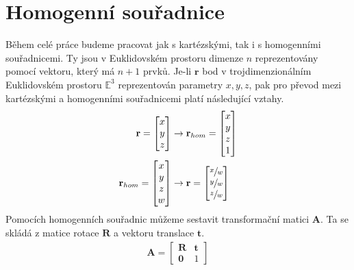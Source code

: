 \documentclass[twoside]{ctuthesis}
\newcommand{\tl}[1]{$\mathbf{#1}$}
\begin{document}
\section{Homogenní souřadnice}
Během celé práce budeme pracovat jak s kartézskými, tak i s homogenními souřadnicemi. Ty jsou v Euklidovském prostoru dimenze $n$ reprezentovány pomocí vektoru, který má $n+1$ prvků. Je-li $\boldsymbol{r}$ bod v trojdimenzionálním Euklidovském prostoru $\mathbb{E}^3$ reprezentován parametry $x,y,z$, pak pro převod mezi kartézskými a homogenními souřadnicemi platí následující vztahy.
\begin{align}
    \mathbf{r} = \begin{bmatrix} x \\ y \\ z \end{bmatrix} &\rightarrow \mathbf{r}_{hom} = \begin{bmatrix} x \\ y \\ z \\ 1 \end{bmatrix} \\
    \mathbf{r}_{hom} = \begin{bmatrix} x \\ y \\ z \\ w \end{bmatrix} &\rightarrow \mathbf{r} = \begin{bmatrix} \sfrac{x}{w} \\ \sfrac{y}{w} \\ \sfrac{z}{w} \end{bmatrix}
\end{align}
Pomocích homogenních souřadnic můžeme sestavit transformační matici \tl{A}. Ta se skládá z matice rotace \tl{R} a vektoru translace \tl{t}.
\begin{align}
    \mathbf{A} = \begin{bmatrix} \mathbf{R} & \mathbf{t} \\ \mathbf{0} & 1 \end{bmatrix}
\end{align}
\end{document}
